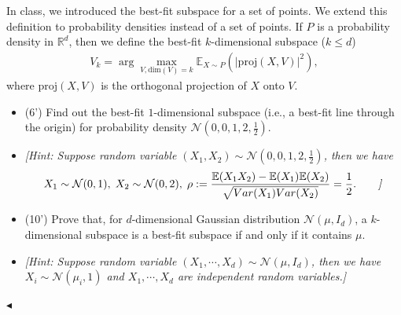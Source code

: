 \documentclass[11pt]{article}
\newenvironment{problem}[2][Problem]{\begin{trivlist}
\item[\hskip \labelsep {\bfseries #1}\hskip \labelsep {\bfseries #2.}]}{\hfill$\blacktriangleleft$\end{trivlist}}
\newcommand\E{\mathbb{E}}
\begin{document}
\begin{problem}{6 (16')}
In class, we introduced the best-fit subspace for a set of points. We extend this definition to probability densities instead of a set of points. If $P$ is a probability density in $\mathbb{R}^d$, then we define the best-fit $k$-dimensional subspace ($k\leq d$)
\begin{align*}
V_k=\arg\max_{V,\mathrm{dim}(V)=k}\E_{X\sim P}(|\mathrm{proj}(X,V)|^2),
\end{align*}
where $\mathrm{proj}(X,V)$ is the orthogonal projection of $X$ onto $V$.
\begin{itemize}
    \item [(1)] (6') Find out the best-fit $1$-dimensional subspace (i.e., a best-fit line through the origin) for probability density $\mathcal{N}\left(0,0,1,2,\frac{1}{2}\right)$.
    \item [] \textit{[Hint: Suppose random variable $(X_1,X_2)\sim\mathcal{N}\left(0,0,1,2,\frac{1}{2}\right)$, then we have}
    \begin{align*}
        X_1\sim\mathcal{N}(0,1),\;X_2\sim\mathcal{N}(0,2),\;\rho:=\frac{\mathbb{E}(X_1X_2)-\mathbb{E}(X_1)\mathbb{E}(X_2)}{\sqrt{Var(X_1)Var(X_2)}}=\frac12.\tag*{\textit{]}}
    \end{align*}
    \item [(2)] (10') Prove that, for $d$-dimensional Gaussian distribution $\mathcal{N}(\mu,I_d)$, a $k$-dimensional subspace is a best-fit subspace if and only if it contains $\mu$.
    \item [] \textit{[Hint: Suppose random variable $(X_1,\cdots,X_d)\sim\mathcal{N}(\mu,I_d)$, then we have $X_i\sim\mathcal{N}(\mu_i,1)$ and $X_1,\cdots,X_d$ are independent random variables.]}
\end{itemize}
\end{problem}
\end{document}
